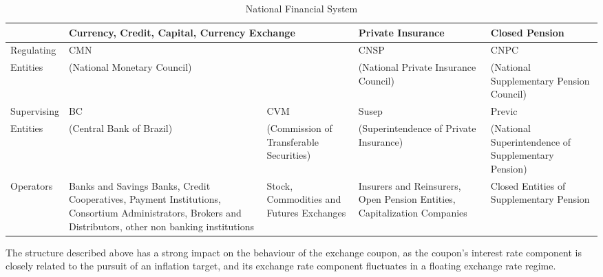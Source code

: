 \documentclass[cic,tc, english]{iiufrgs}
\begin{document}
    \begin{table}[H]
        \caption{National Financial System}
        \label{tab:sistemanacional}
        \centering
        \begin{tabular}{|l|p{2.3cm}|p{2.3cm}|p{2.3cm}|p{2.3cm}|}
            \hline
             & \multicolumn{2}{|p{4.6cm}||}{Currency, Credit, Capital, Currency Exchange} & \multicolumn{1}{l||}{Private Insurance} & \multicolumn{1}{l|}{Closed Pension} \\
            \hline
            \multicolumn{1}{|l|}{Regulating} & \multicolumn{2}{l||}{CMN} & \multicolumn{1}{p{2.3cm}||}{CNSP} & \multicolumn{1}{p{2.3cm}|}{CNPC} \\
            \multicolumn{1}{|l|}{Entities} & \multicolumn{2}{l||}{(National Monetary Council)} & \multicolumn{1}{p{2.75cm}||}{(National Private Insurance Council)} & \multicolumn{1}{p{2.3cm}|}{(National Supplementary Pension Council)} \\ \hline
            \multicolumn{1}{|l|}{Supervising} & \multicolumn{1}{p{2.3cm}||}{BC} & \multicolumn{1}{p{2.3cm}||}{CVM} & \multicolumn{1}{p{2.3cm}||}{Susep} & \multicolumn{1}{p{2.3cm}|}{Previc} \\
            \multicolumn{1}{|l|}{Entities} & \multicolumn{1}{p{2.3cm}||}{(Central Bank of Brazil)} & \multicolumn{1}{p{2.3cm}||}{(Commission of Transferable Securities)} & \multicolumn{1}{p{2.75cm}||}{(Superintendence of Private Insurance)} & \multicolumn{1}{p{2.3cm}|}{(National Superintendence of Supplementary Pension)} \\ \hline
            \multicolumn{1}{|l|}{Operators} & \multicolumn{1}{p{2.3cm}||}{Banks and Savings Banks,  Credit Cooperatives, Payment Institutions, Consortium Administrators, Brokers and Distributors, other non banking institutions} & \multicolumn{1}{p{2.3cm}||}{Stock, Commodities and Futures Exchanges} & \multicolumn{1}{p{2.75cm}||}{Insurers and Reinsurers, Open Pension Entities, Capitalization Companies} & \multicolumn{1}{p{2.3cm}|}{Closed Entities of Supplementary Pension} \\
            \hline
        \end{tabular}
    \end{table}

    The structure described above has a strong impact on the behaviour of the exchange coupon, as the coupon's interest rate component is closely related to the pursuit of an inflation target, and its exchange rate component fluctuates in a floating exchange rate regime.
\end{document}
